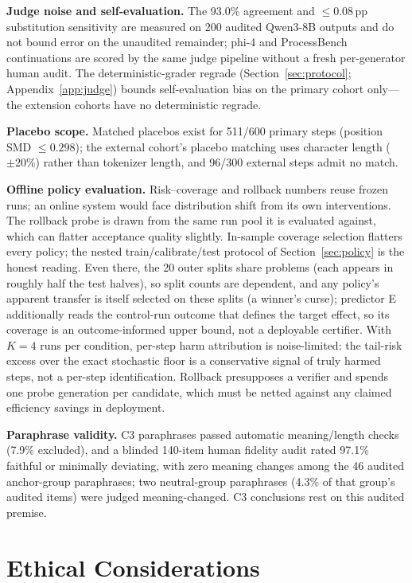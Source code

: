 \documentclass[11pt]{article}
\begin{document}
\textbf{Judge noise and self-evaluation.} The 93.0\% agreement and $\le 0.08$\,pp substitution sensitivity are measured on 200 audited Qwen3-8B outputs and do not bound error on the unaudited remainder; phi-4 and ProcessBench continuations are scored by the same judge pipeline without a fresh per-generator human audit. The deterministic-grader regrade (Section~\ref{sec:protocol}; Appendix~\ref{app:judge}) bounds self-evaluation bias on the primary cohort only---the extension cohorts have no deterministic regrade.

\textbf{Placebo scope.} Matched placebos exist for 511/600 primary steps (position SMD $\le 0.298$); the external cohort's placebo matching uses character length ($\pm 20\%$) rather than tokenizer length, and 96/300 external steps admit no match.

\textbf{Offline policy evaluation.} Risk--coverage and rollback numbers reuse frozen runs; an online system would face distribution shift from its own interventions. The rollback probe is drawn from the same run pool it is evaluated against, which can flatter acceptance quality slightly. In-sample coverage selection flatters every policy; the nested train/calibrate/test protocol of Section~\ref{sec:policy} is the honest reading. Even there, the 20 outer splits share problems (each appears in roughly half the test halves), so split counts are dependent, and any policy's apparent transfer is itself selected on these splits (a winner's curse); predictor E additionally reads the control-run outcome that defines the target effect, so its coverage is an outcome-informed upper bound, not a deployable certifier. With $K{=}4$ runs per condition, per-step harm attribution is noise-limited: the tail-risk excess over the exact stochastic floor is a conservative signal of truly harmed steps, not a per-step identification. Rollback presupposes a verifier and spends one probe generation per candidate, which must be netted against any claimed efficiency savings in deployment.

\textbf{Paraphrase validity.} C3 paraphrases passed automatic meaning/length checks (7.9\% excluded), and a blinded 140-item human fidelity audit rated 97.1\% faithful or minimally deviating, with zero meaning changes among the 46 audited anchor-group paraphrases; two neutral-group paraphrases (4.3\% of that group's audited items) were judged meaning-changed. C3 conclusions rest on this audited premise.

\section*{Ethical Considerations}
\end{document}
